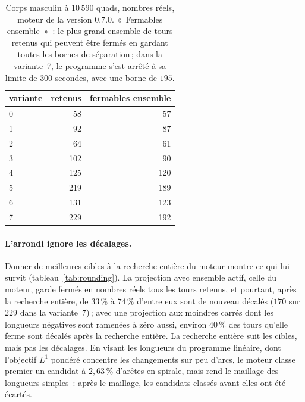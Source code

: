 \documentclass[11pt,a4paper]{article}
\begin{document}
\begin{table}[t]
\centering
\begin{tabular}{lrr}
\toprule
variante & retenus & fermables ensemble \\
\midrule
0 & 58 & 57 \\
1 & 92 & 87 \\
2 & 64 & 61 \\
3 & 102 & 90 \\
4 & 125 & 120 \\
5 & 219 & 189 \\
6 & 131 & 123 \\
7 & 229 & 192 \\
\bottomrule
\end{tabular}
\caption{Corps masculin à $10\,590$ quads, nombres réels, moteur de la
version 0.7.0. «~Fermables ensemble~»~: le plus grand ensemble de tours
retenus qui peuvent être fermés en gardant toutes les bornes de
séparation\,; dans la variante~7, le programme s'est arrêté à sa limite de
$300$ secondes, avec une borne de $195$.}
\label{tab:exact}
\end{table}

\paragraph{L'arrondi ignore les décalages.}
Donner de meilleures cibles à la recherche entière du moteur montre ce qui
lui survit (tableau~\ref{tab:rounding}). La projection avec ensemble actif,
celle du moteur, garde fermés en nombres réels tous les tours retenus, et
pourtant, après la recherche entière, de $33\,\%$ à $74\,\%$ d'entre eux
sont de nouveau décalés ($170$ sur $229$ dans la variante~7)\,; avec une
projection aux moindres carrés dont les longueurs négatives sont ramenées à
zéro aussi, environ $40\,\%$ des tours qu'elle ferme sont décalés après la
recherche entière. La recherche entière suit les cibles, mais pas les
décalages. En visant les longueurs du programme linéaire, dont l'objectif
$L^1$ pondéré concentre les changements sur peu d'arcs, le moteur classe
premier un candidat à $2,63\,\%$ d'arêtes en spirale, mais rend le maillage
des longueurs simples~: après le maillage, les candidats classés avant
elles ont été écartés.
\end{document}
